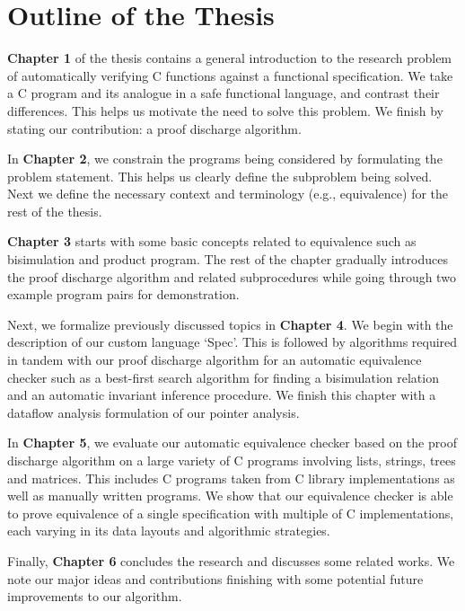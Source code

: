 \section{Outline of the Thesis}
\label{sec:outlinethesis}
\textbf{Chapter 1} of the thesis contains a general introduction to the research problem of automatically verifying C functions against a functional specification.
We take a C program and its analogue in a safe functional language, and contrast their differences. This helps us motivate the need to solve this problem.
We finish by stating our contribution: a proof discharge algorithm.

In \textbf{Chapter 2}, we constrain the programs being considered by formulating the problem statement. This helps us clearly define the
subproblem being solved. Next we define the necessary context and terminology (e.g., equivalence) for the rest of the thesis.

\textbf{Chapter 3} starts with some basic concepts related to equivalence such as bisimulation and product program.
The rest of the chapter gradually introduces the proof discharge algorithm and related subprocedures while
going through two example program pairs for demonstration.

Next, we formalize previously discussed topics in \textbf{Chapter 4}. We begin with the description of our custom language `Spec'. This is followed by
algorithms required in tandem with our proof discharge algorithm for an automatic equivalence checker such as a best-first search algorithm
for finding a bisimulation relation and an automatic invariant inference procedure. We finish this chapter with a dataflow analysis formulation
of our pointer analysis.

In \textbf{Chapter 5}, we evaluate our automatic equivalence checker based on the proof discharge algorithm on a large variety of C programs involving
lists, strings, trees and matrices.
This includes C programs taken from C library implementations as well as manually written programs. We show that our equivalence checker is able
to prove equivalence of a single specification with multiple of C implementations, each varying in its data layouts and algorithmic
strategies.

Finally, \textbf{Chapter 6} concludes the research and discusses some related works. We note our major ideas and contributions finishing with
some potential future improvements to our algorithm.